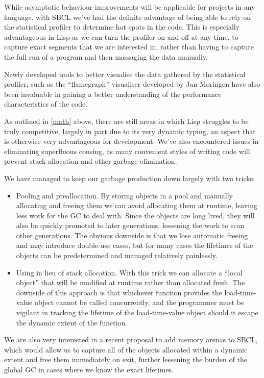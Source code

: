 \documentclass[format=sigconf]{acmart}
\begin{document}
While asymptotic behaviour improvements will be applicable for projects in any language, with SBCL we've had the definite advantage of being able to rely on the statistical profiler to determine hot spots in the code. This is especially advantageous in Lisp as we can turn the profiler on and off at any time, to capture exact segments that we are interested in, rather than having to capture the full run of a program and then massaging the data manually.

Newly developed tools to better visualise the data gathered by the statistical profiler, such as the ``flamegraph'' visualiser developed by Jan Moringen have also been invaluable in gaining a better understanding of the performance characteristics of the code.

As outlined in \autoref{math} above, there are still areas in which Lisp struggles to be truly competitive, largely in part due to its very dynamic typing, an aspect that is otherwise very advantageous for development. We've also encountered issues in eliminating superfluous consing, as many convenient styles of writing code will prevent stack allocation and other garbage elimination.

We have managed to keep our garbage production down largely with two tricks:

\begin{itemize}
\item Pooling and preallocation. By storing objects in a pool and manually allocating and freeing them we can avoid allocating them at runtime, leaving less work for the GC to deal with. Since the objects are long lived, they will also be quickly promoted to later generations, lessening the work to scan other generations. The obvious downside is that we lose automatic freeing and may introduce double-use cases, but for many cases the lifetimes of the objects can be predetermined and managed relatively painlessly.
\item Using  in lieu of stack allocation. With this trick we can allocate a ``local object'' that will be modified at runtime rather than allocated fresh. The downside of this approach is that whichever function provides the load-time-value object cannot be called concurrently, and the programmer must be vigilant in tracking the lifetime of the load-time-value object should it escape the dynamic extent of the function.
\end{itemize}

We are also very interested in a recent proposal to add memory arenas to SBCL, which would allow us to capture all of the objects allocated within a dynamic extent and free them immediately on exit, further lessening the burden of the global GC in cases where we know the exact lifetimes.
\end{document}
